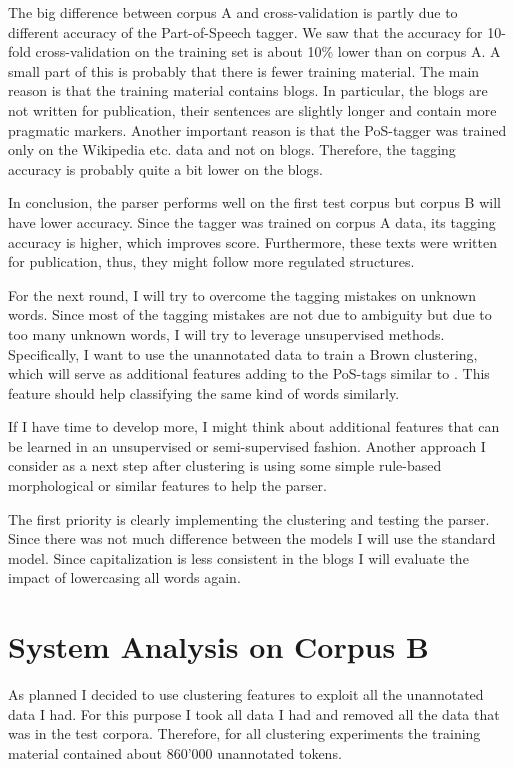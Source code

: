 \documentclass[11pt,letterpaper, covington]{article}
\begin{document}
The big difference between corpus A and cross-validation is partly due to different accuracy of the Part-of-Speech tagger. We saw that the accuracy for 10-fold cross-validation on the training set is about 10\% lower than on corpus A. A small part of this is probably that there is fewer training material. The main reason is that the training material contains blogs. In particular, the blogs are not written for publication, their sentences are slightly longer and contain more pragmatic markers. Another important reason is that the PoS-tagger was trained only on the Wikipedia etc. data and not on blogs. Therefore, the tagging accuracy is probably quite a bit lower on the blogs. 

In conclusion, the parser performs well on the first test corpus but corpus B will have lower accuracy. Since the tagger was trained on corpus A data, its tagging accuracy is higher, which improves score. Furthermore, these texts were written for publication, thus, they might follow more regulated structures. 

For the next round, I will try to overcome the tagging mistakes on unknown words. Since most of the tagging mistakes are not due to ambiguity but due to too many unknown words, I will try to leverage unsupervised methods. Specifically, I want to use the unannotated data to train a Brown clustering, which will serve as additional features adding to the PoS-tags similar to \citet{KCC08}. This feature should help classifying the same kind of words similarly. 

If I have time to develop more, I might think about additional features that can be learned in an unsupervised or semi-supervised fashion. Another approach I consider as a next step after clustering is using some simple rule-based morphological or similar features to help the parser. 

The first priority is clearly implementing the clustering and testing the parser. Since there was not much difference between the models I will use the standard model. Since capitalization is less consistent in the blogs I will evaluate the impact of lowercasing all words again. 

\section{System Analysis on Corpus B}

As planned I decided to use clustering features to exploit all the unannotated data I had.
For this purpose I took all data I had and removed all the data that was in the test corpora. Therefore, for all clustering experiments the training material contained about 860'000 unannotated tokens.
\end{document}
